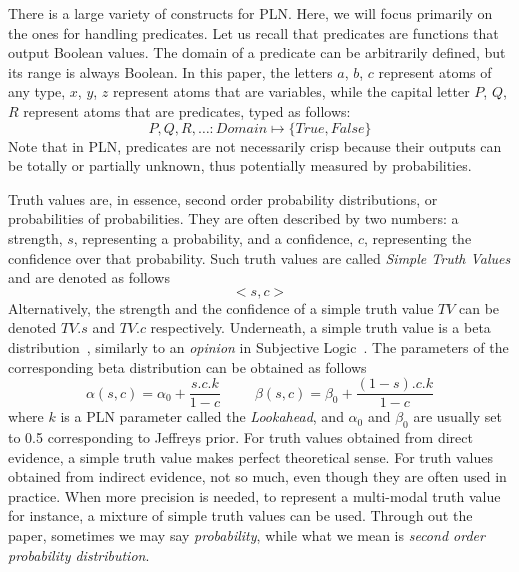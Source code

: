 \documentclass[runningheads]{llncs}
\newcommand{\TTrue}{\textit{True}}
\newcommand{\TFalse}{\textit{False}}
\newcommand{\TAtom}{\textit{Atom}}
\newcommand{\TEval}{\textit{Evaluation}}
\newcommand{\TLamb}{\textit{Lambda}}
\newcommand{\TAnd}{\textit{And}}
\newcommand{\TOr}{\textit{Or}}
\newcommand{\TNot}{\textit{Not}}
\newcommand{\TImpl}{\textit{Implication}}
\newcommand{\TTV}{\textit{TV}}
\begin{document}
There is a large variety of constructs for PLN.  Here, we will focus
primarily on the ones for handling predicates.  Let us recall that
predicates are functions that output Boolean values.  The domain of a
predicate can be arbitrarily defined, but its range is always Boolean.
In this paper, the letters $a$, $b$, $c$ represent atoms of
any type, $x$, $y$, $z$ represent atoms that are variables, while the
capital letter $P$, $Q$, $R$ represent atoms that are predicates,
typed as follows:
$$P, Q, R, \hdots: \textit{Domain} \mapsto \{\TTrue, \TFalse\}$$
Note that in PLN, predicates are not necessarily crisp because their
outputs can be totally or partially unknown, thus potentially measured
by probabilities.

Truth values are, in essence, second order probability distributions,
or probabilities of probabilities.  They are often described by two
numbers: a strength, $s$, representing a probability, and a
confidence, $c$, representing the confidence over that probability.
Such truth values are called \emph{Simple Truth Values} and are
denoted as follows
$$<\!s, c\!>$$
Alternatively, the strength and the confidence of a simple truth value
$\TTV$ can be denoted $\TTV.s$ and $\TTV.c$ respectively.  Underneath,
a simple truth value is a beta distribution~\cite{Abourizk94Fitting},
similarly to an \emph{opinion} in Subjective Logic~\cite{Josang2026}.
The parameters of the corresponding beta distribution can be obtained
as follows
$$\alpha(s, c)=\alpha_0 + \frac{s.c.k}{1-c}\ \ \ \ \ \ \ \ \ \ \
\beta(s, c)=\beta_0 + \frac{(1-s).c.k}{1-c}$$ where $k$ is a PLN
parameter called the \emph{Lookahead}, and $\alpha_0$ and $\beta_0$
are usually set to 0.5 corresponding to Jeffreys prior.  For truth
values obtained from direct evidence, a simple truth value makes
perfect theoretical sense.  For truth values obtained from indirect
evidence, not so much, even though they are often used in practice.
When more precision is needed, to represent a multi-modal truth value
for instance, a mixture of simple truth values can be used.  Through
out the paper, sometimes we may say \emph{probability}, while what we
mean is \emph{second order probability distribution}.


\end{document}
